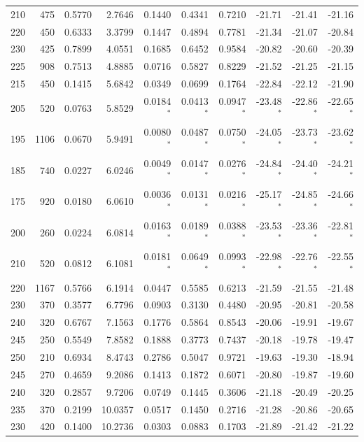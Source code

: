 {\begin{landscape}
\begin{longtable}{r r r r r r r r r r}
210 & 475 & 0.5770 & 2.7646 & 0.1440 & 0.4341 & 0.7210 & -21.71 & -21.41 & -21.16 \\
220 & 450 & 0.6333 & 3.3799 & 0.1447 & 0.4894 & 0.7781 & -21.34 & -21.07 & -20.84 \\
230 & 425 & 0.7899 & 4.0551 & 0.1685 & 0.6452 & 0.9584 & -20.82 & -20.60 & -20.39 \\
225 & 908 & 0.7513 & 4.8885 & 0.0716 & 0.5827 & 0.8229 & -21.52 & -21.25 & -21.15 \\
215 & 450 & 0.1415 & 5.6842 & 0.0349 & 0.0699 & 0.1764 & -22.84 & -22.12 & -21.90 \\
205 & 520 & 0.0763 & 5.8529 & 0.0184$^*$ & 0.0413$^*$ & 0.0947$^*$ & -23.48$^*$ & -22.86$^*$ & -22.65$^*$ \\
195 & 1106 & 0.0670 & 5.9491 & 0.0080$^*$ & 0.0487$^*$ & 0.0750$^*$ & -24.05$^*$ & -23.73$^*$ & -23.62$^*$ \\
185 & 740 & 0.0227 & 6.0246 & 0.0049$^*$ & 0.0147$^*$ & 0.0276$^*$ & -24.84$^*$ & -24.40$^*$ & -24.21$^*$ \\
175 & 920 & 0.0180 & 6.0610 & 0.0036$^*$ & 0.0131$^*$ & 0.0216$^*$ & -25.17$^*$ & -24.85$^*$ & -24.66$^*$ \\
200 & 260 & 0.0224 & 6.0814 & 0.0163$^*$ & 0.0189$^*$ & 0.0388$^*$ & -23.53$^*$ & -23.36$^*$ & -22.81$^*$ \\
210 & 520 & 0.0812 & 6.1081 & 0.0181$^*$ & 0.0649$^*$ & 0.0993$^*$ & -22.98$^*$ & -22.76$^*$ & -22.55$^*$ \\
220 & 1167 & 0.5766 & 6.1914 & 0.0447 & 0.5585 & 0.6213 & -21.59 & -21.55 & -21.48 \\
230 & 370 & 0.3577 & 6.7796 & 0.0903 & 0.3130 & 0.4480 & -20.95 & -20.81 & -20.58 \\
240 & 320 & 0.6767 & 7.1563 & 0.1776 & 0.5864 & 0.8543 & -20.06 & -19.91 & -19.67 \\
245 & 250 & 0.5549 & 7.8582 & 0.1888 & 0.3773 & 0.7437 & -20.18 & -19.78 & -19.47 \\
250 & 210 & 0.6934 & 8.4743 & 0.2786 & 0.5047 & 0.9721 & -19.63 & -19.30 & -18.94 \\
245 & 270 & 0.4659 & 9.2086 & 0.1413 & 0.1872 & 0.6071 & -20.80 & -19.87 & -19.60 \\
240 & 320 & 0.2857 & 9.7206 & 0.0749 & 0.1445 & 0.3606 & -21.18 & -20.49 & -20.25 \\
235 & 370 & 0.2199 & 10.0357 & 0.0517 & 0.1450 & 0.2716 & -21.28 & -20.86 & -20.65 \\
230 & 420 & 0.1400 & 10.2736 & 0.0303 & 0.0883 & 0.1703 & -21.89 & -21.42 & -21.22 \\

\end{longtable}
\end{landscape}}
